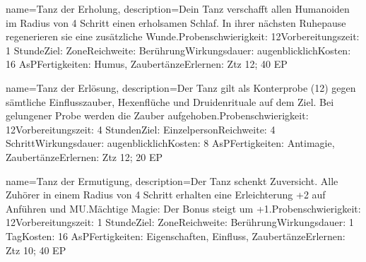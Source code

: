 {
    name={Tanz der Erholung},
    description={Dein Tanz verschafft allen Humanoiden im Radius von 4 Schritt einen erholsamen Schlaf. In ihrer nächsten Ruhepause regenerieren sie eine zusätzliche Wunde.\newline Probenschwierigkeit: 12\newline Vorbereitungszeit: 1 Stunde\newline Ziel: Zone\newline Reichweite: Berührung\newline Wirkungsdauer: augenblicklich\newline Kosten: 16 AsP\newline Fertigkeiten: Humus, Zaubertänze\newline Erlernen: Ztz 12; 40 EP}
}


{
    name={Tanz der Erlösung},
    description={Der Tanz gilt als Konterprobe (12) gegen sämtliche Einflusszauber, Hexenflüche und Druidenrituale auf dem Ziel. Bei gelungener Probe werden die Zauber aufgehoben.\newline Probenschwierigkeit: 12\newline Vorbereitungszeit: 4 Stunden\newline Ziel: Einzelperson\newline Reichweite: 4 Schritt\newline Wirkungsdauer: augenblicklich\newline Kosten: 8 AsP\newline Fertigkeiten: Antimagie, Zaubertänze\newline Erlernen: Ztz 12; 20 EP}
}


{
    name={Tanz der Ermutigung},
    description={Der Tanz schenkt Zuversicht. Alle Zuhörer in einem Radius von 4 Schritt erhalten eine Erleichterung +2 auf Anführen und MU.\newline Mächtige Magie: Der Bonus steigt um +1.\newline Probenschwierigkeit: 12\newline Vorbereitungszeit: 1 Stunde\newline Ziel: Zone\newline Reichweite: Berührung\newline Wirkungsdauer: 1 Tag\newline Kosten: 16 AsP\newline Fertigkeiten: Eigenschaften, Einfluss, Zaubertänze\newline Erlernen: Ztz 10; 40 EP}
}


